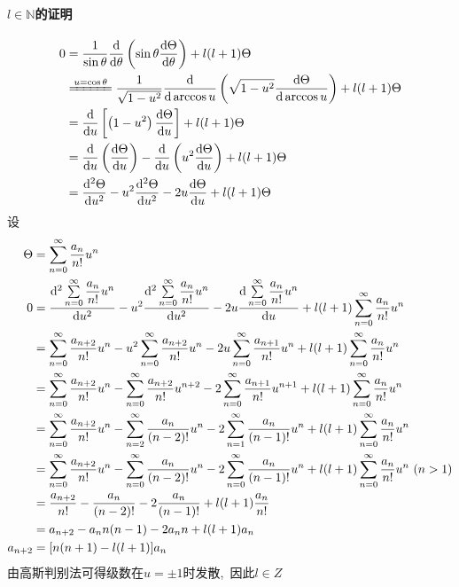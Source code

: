 \paragraph{$l\in \mathbb N$的证明}
\begin{align*}
    0&=\frac{1}{\sin\theta}
\frac{\dif }{\dif \theta}
\left(
\sin\theta \frac{\dif \Theta}{\dif \theta}
\right)
+
l(l+1)\Theta\\
&\xlongequal{u=\cos\theta}\frac{1}{\sqrt{1-u^2}}
\frac{\dif }{\dif \arccos u}
\left(
\sqrt{1-u^2} \frac{\dif \Theta}{\dif \arccos u}
\right)
+
l(l+1)\Theta\\
&=
\frac{\dif }{\dif u}
\left[\left(1-u^2\right)\frac{\dif \Theta}{\dif u}
\right]
+
l(l+1)\Theta\\
&=
\frac{\dif }{\dif u}\left(\frac{\dif \Theta}{\dif u}\right)
-\frac{\dif }{\dif u}\left(u^2\frac{\dif \Theta}{\dif u}\right)
+
l(l+1)\Theta\\
&=
\frac{\dif^2 \Theta}{\dif u^2}
-u^2\frac{\dif^2 \Theta}{\dif u^2}
-2u\frac{\dif \Theta}{\dif u}
+l(l+1)\Theta
\end{align*}
设
\begin{align*}
    \Theta&=\sum\limits_{n=0}^{\infty}\frac{a_n}{n!}u^n\\
    0&=
\frac{\dif^2 \sum\limits_{n=0}^{\infty}\dfrac{a_n}{n!}u^n}{\dif u^2}
-u^2\frac{\dif^2 \sum\limits_{n=0}^{\infty}\dfrac{a_n}{n!}u^n}{\dif u^2}
-2u\frac{\dif \sum\limits_{n=0}^{\infty}\dfrac{a_n}{n!}u^n}{\dif u}
+l(l+1)\sum\limits_{n=0}^{\infty}\dfrac{a_n}{n!}u^n\\
&=
\sum\limits_{n=0}^{\infty}\dfrac{a_{n+2}}{n!}u^n
-u^2\sum\limits_{n=0}^{\infty}\dfrac{a_{n+2}}{n!}u^n
-2u\sum\limits_{n=0}^{\infty}\dfrac{a_{n+1}}{n!}u^n
+l(l+1)\sum\limits_{n=0}^{\infty}\dfrac{a_{n}}{n!}u^n\\
&=
\sum\limits_{n=0}^{\infty}\dfrac{a_{n+2}}{n!}u^n
-\sum\limits_{n=0}^{\infty}\dfrac{a_{n+2}}{n!}u^{n+2}
-2\sum\limits_{n=0}^{\infty}\dfrac{a_{n+1}}{n!}u^{n+1}
+l(l+1)\sum\limits_{n=0}^{\infty}\dfrac{a_{n}}{n!}u^n\\
&=
\sum\limits_{n=0}^{\infty}\dfrac{a_{n+2}}{n!}u^n
-\sum\limits_{n=2}^{\infty}\dfrac{a_{n}}{(n-2)!}u^{n}
-2\sum\limits_{n=1}^{\infty}\dfrac{a_{n}}{(n-1)!}u^{n}
+l(l+1)\sum\limits_{n=0}^{\infty}\dfrac{a_{n}}{n!}u^n\\
&=
\sum\limits_{n=0}^{\infty}\dfrac{a_{n+2}}{n!}u^n
-\sum\limits_{n=0}^{\infty}\dfrac{a_{n}}{(n-2)!}u^{n}
-2\sum\limits_{n=0}^{\infty}\dfrac{a_{n}}{(n-1)!}u^{n}
+l(l+1)\sum\limits_{n=0}^{\infty}\dfrac{a_{n}}{n!}u^n\, \,(n>1)\\
&=
\dfrac{a_{n+2}}{n!}
-\dfrac{a_{n}}{(n-2)!}
-2\dfrac{a_{n}}{(n-1)!}
+l(l+1)\dfrac{a_{n}}{n!}\\
&=
a_{n+2}
-a_{n}n(n-1)
-2a_{n}n
+l(l+1)a_{n}\\
a_{n+2}&=[n(n+1)-l(l+1)]a_n
\end{align*}
由高斯判别法可得级数在$u=\pm 1$时发散, \,因此$l\in Z$

